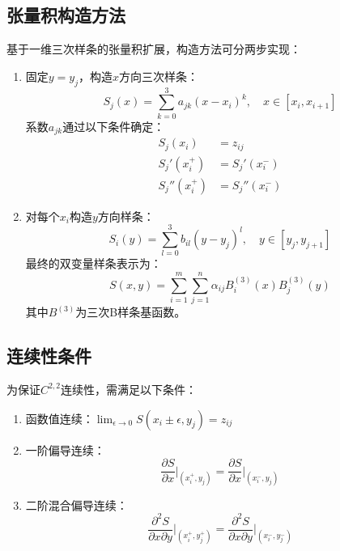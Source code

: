 \subsection{张量积构造方法}
基于一维三次样条的张量积扩展，构造方法可分两步实现：

\begin{enumerate}
    \item 固定$y = y_j$，构造$x$方向三次样条：
    \begin{equation}
        S_j(x) = \sum_{k=0}^3 a_{jk}(x-x_i)^k,\quad x \in [x_i,x_{i+1}]
    \end{equation}
    系数$a_{jk}$通过以下条件确定：
    \begin{align}
        S_j(x_i) &= z_{ij} \\
        S_j'(x_i^+) &= S_j'(x_i^-) \\
        S_j''(x_i^+) &= S_j''(x_i^-)
    \end{align}
    
    \item 对每个$x_i$构造$y$方向样条：
    \begin{equation}
        S_i(y) = \sum_{l=0}^3 b_{il}(y-y_j)^l,\quad y \in [y_j,y_{j+1}]
    \end{equation}
    最终的双变量样条表示为：
    \begin{equation}
        S(x,y) = \sum_{i=1}^m \sum_{j=1}^n \alpha_{ij} B_i^{(3)}(x) B_j^{(3)}(y)
    \end{equation}
    其中$B^{(3)}$为三次B样条基函数\cite{deboor1978}。
\end{enumerate}
\subsection{连续性条件}
为保证$C^{2,2}$连续性，需满足以下条件：
\begin{enumerate}
    \item 函数值连续：$\lim_{\epsilon \to 0} S(x_i \pm \epsilon, y_j) = z_{ij}$
    \item 一阶偏导连续：
    \begin{equation}
        \frac{\partial S}{\partial x}\bigg|_{(x_i^+,y_j)} = \frac{\partial S}{\partial x}\bigg|_{(x_i^-,y_j)}
    \end{equation}
    \item 二阶混合偏导连续：
    \begin{equation}
        \frac{\partial^2 S}{\partial x \partial y}\bigg|_{(x_i^+,y_j^+)} = \frac{\partial^2 S}{\partial x \partial y}\bigg|_{(x_i^-,y_j^-)}
    \end{equation}
\end{enumerate}
